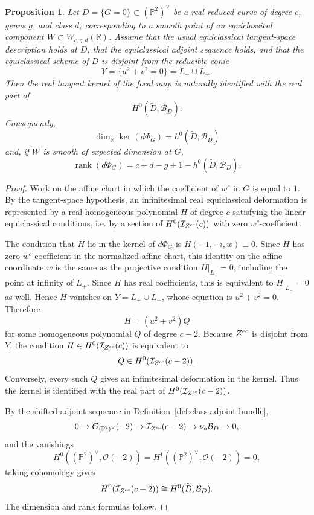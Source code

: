 \documentclass[11pt]{amsart}
\newtheorem{prop}[lemma]{Proposition}
\theoremstyle{definition}
\theoremstyle{remark}
\newcommand{\bR}{\mathbb{R}}
\newcommand{\bP}{\mathbb{P}}
\newcommand{\B}{\mathcal{B}}
\begin{document}
\begin{prop}\label{prop:kernel-B}
Let $D=\{G=0\}\subset (\bP^2)^\vee$ be a real reduced curve of degree $c$, genus $g$, and class $d$, corresponding to a smooth point of an equiclassical component $W\subset W_{c,g,d}(\bR)$. Assume that the usual equiclassical tangent-space description holds at $D$, that the equiclassical adjoint sequence holds, and that the equiclassical scheme of $D$ is disjoint from the reducible conic
\[
Y=\{u^2+v^2=0\}=L_+\cup L_-.
\]
Then the real tangent kernel of the focal map is naturally identified with the real part of
\[
H^0(\widetilde D,\B_D).
\]
Consequently,
\[
\dim_{\bR}\ker(d\Phi_G)=h^0(\widetilde D,\B_D)
\]
and, if $W$ is smooth of expected dimension at $G$,
\[
\operatorname{rank}(d\Phi_G)=c+d-g+1-h^0(\widetilde D,\B_D).
\]
\end{prop}

\begin{proof}
Work on the affine chart in which the coefficient of $w^c$ in $G$ is equal to $1$. By the tangent-space hypothesis, an infinitesimal real equiclassical deformation is represented by a real homogeneous polynomial $H$ of degree $c$ satisfying the linear equiclassical conditions, i.e. by a section of $H^0(\mathcal I_{Z^{\rm ec}}(c))$ with zero $w^c$-coefficient.

The condition that $H$ lie in the kernel of $d\Phi_G$ is $H(-1,-i,w)\equiv 0$. Since $H$ has zero $w^c$-coefficient in the normalized affine chart, this identity on the affine coordinate $w$ is the same as the projective condition $H|_{L_+}=0$, including the point at infinity of $L_+$. Since $H$ has real coefficients, this is equivalent to $H|_{L_-}=0$ as well. Hence $H$ vanishes on $Y=L_+\cup L_-$, whose equation is $u^2+v^2=0$. Therefore
\[
H=(u^2+v^2)Q
\]
for some homogeneous polynomial $Q$ of degree $c-2$.
Because $Z^{\rm ec}$ is disjoint from $Y$, the condition $H\in H^0(\mathcal I_{Z^{\rm ec}}(c))$ is equivalent to
\[
Q\in H^0(\mathcal I_{Z^{\rm ec}}(c-2)).
\]
Conversely, every such $Q$ gives an infinitesimal deformation in the kernel.
Thus the kernel is identified with the real part of $H^0(\mathcal I_{Z^{\rm ec}}(c-2))$.

By the shifted adjoint sequence in Definition~\ref{def:class-adjoint-bundle},
\[
0\to\mathcal O_{(\bP^2)^\vee}(-2)
\to \mathcal I_{Z^{\rm ec}}(c-2)
\to \nu_*\B_D\to0,
\]
and the vanishings
\[
H^0((\bP^2)^\vee,\mathcal O(-2))=H^1((\bP^2)^\vee,\mathcal O(-2))=0,
\]
taking cohomology gives
\[
H^0(\mathcal I_{Z^{\rm ec}}(c-2))\cong H^0(\widetilde D,\B_D).
\]
The dimension and rank formulas follow.
\end{proof}
\end{document}
